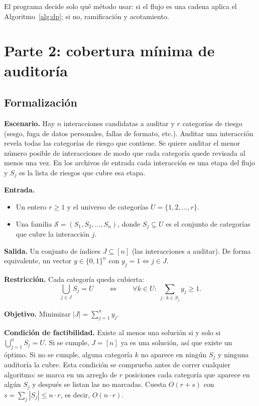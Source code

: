 \documentclass[11pt,a4paper]{article}
\theoremstyle{definition}
\begin{document}
El programa decide solo qué método usar: si el flujo es una cadena aplica el Algoritmo~\ref{alg:dp}; si no, ramificación y acotamiento.

\section{Parte 2: cobertura mínima de auditoría}

\subsection{Formalización}

\textbf{Escenario.} Hay $n$ interacciones candidatas a auditar y $r$ categorías de riesgo (sesgo, fuga de datos personales, fallas de formato, etc.). Auditar una interacción revela todas las categorías de riesgo que contiene. Se quiere auditar el menor número posible de interacciones de modo que cada categoría quede revisada al menos una vez. En los archivos de entrada cada interacción es una etapa del flujo y $S_j$ es la lista de riesgos que cubre esa etapa.

\textbf{Entrada.}
\begin{itemize}[nosep]
  \item Un entero $r\ge 1$ y el universo de categorías $U=\{1,2,\dots,r\}$.
  \item Una familia $\mathcal{S}=(S_1,S_2,\dots,S_n)$, donde $S_j\subseteq U$ es el conjunto de categorías que cubre la interacción $j$.
\end{itemize}

\textbf{Salida.} Un conjunto de índices $J\subseteq[n]$ (las interacciones a auditar). De forma equivalente, un vector $y\in\{0,1\}^n$ con $y_j=1\iff j\in J$.

\textbf{Restricción.} Cada categoría queda cubierta:
\[
\bigcup_{j\in J}S_j=U
\qquad\Longleftrightarrow\qquad
\forall k\in U:\ \sum_{j\,:\,k\in S_j}y_j\ge 1 .
\]

\textbf{Objetivo.} Minimizar $|J|=\sum_{j=1}^{n}y_j$.

\textbf{Condición de factibilidad.} Existe al menos una solución si y solo si $\bigcup_{j=1}^{n}S_j=U$. Si se cumple, $J=[n]$ ya es una solución, así que existe un óptimo. Si no se cumple, alguna categoría $k$ no aparece en ningún $S_j$ y ninguna auditoría la cubre. Esta condición se comprueba antes de correr cualquier algoritmo: se marca en un arreglo de $r$ posiciones cada categoría que aparece en algún $S_j$ y después se listan las no marcadas. Cuesta $O(r+s)$ con $s=\sum_j|S_j|\le n\cdot r$, es decir, $O(n\cdot r)$.
\end{document}
